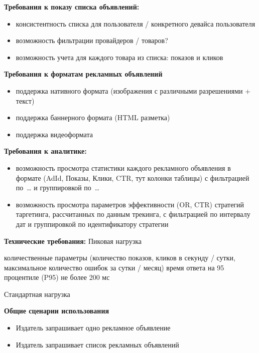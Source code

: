 \documentclass[times]{itmo-student-thesis}
\begin{document}
\textbf{Требования к показу списка объявлений:}
\begin{itemize}
	\item консистентность списка для пользователя / конкретного девайса пользователя
	\item возможность фильтрации провайдеров / товаров?
	\item возможность учета для каждого товара из списка: показов и кликов
\end{itemize}

\textbf{Требования к форматам рекламных объявлений}
\begin{itemize}
	\item поддержка нативного формата (изображения с различными разрешениями + текст)
	\item поддержка баннерного формата (HTML разметка)
	\item поддержка видеоформата
\end{itemize}

\textbf{Требования к аналитике:}
\begin{itemize}
	\item возможность просмотра статистики каждого рекламного объявления в формате (AdId, Показы, Клики, CTR, тут колонки таблицы) с фильтрацией по … и группировкой по …
	\item возможность просмотра параметров эффективности (OR, CTR) стратегий таргетинга, рассчитанных по данным трекинга, с фильтрацией по интервалу дат и группировкой по идентификатору стратегии
\end{itemize}

\textbf{Технические требования:} 
Пиковая нагрузка

количественные параметры (количество показов, кликов в секунду / сутки, максимальное количество ошибок за сутки / месяц)
время ответа на 95 процентиле (P95) не более 200 мс

Стандартная нагрузка

\textbf{Общие сценарии использования}
\begin{itemize}
	\item Издатель запрашивает одно рекламное объявление
	\item Издатель запрашивает список рекламных объявлений
\end{itemize}
\end{document}
